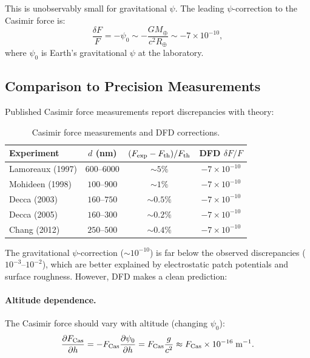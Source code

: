 \documentclass[aps,prb,twocolumn,superscriptaddress,floatfix,nofootinbib,longbibliography]{revtex4-2}
\begin{document}
This is unobservably small for gravitational $\psi$.  The leading
$\psi$-correction to the Casimir force is:
\begin{equation}
\frac{\delta F}{F} = -\psi_0 \sim -\frac{GM_\oplus}{c^2 R_\oplus}
\sim -7 \times 10^{-10},
\label{eq:casimir-earth}
\end{equation}
where $\psi_0$ is Earth's gravitational $\psi$ at the laboratory.

\subsection{Comparison to Precision Measurements}

Published Casimir force measurements report discrepancies with theory:

\begin{table}[h]
\caption{Casimir force measurements and DFD corrections.}
\label{tab:casimir}
\begin{ruledtabular}
\begin{tabular}{lccc}
Experiment & $d$ (nm) & $(F_{\rm exp} - F_{\rm th})/F_{\rm th}$ & DFD $\delta F/F$ \\
\hline
Lamoreaux (1997) & $600$--$6000$ & $\sim 5\%$ & $-7\times 10^{-10}$ \\
Mohideen (1998) & $100$--$900$ & $\sim 1\%$ & $-7\times 10^{-10}$ \\
Decca (2003) & $160$--$750$ & $\sim 0.5\%$ & $-7\times 10^{-10}$ \\
Decca (2005) & $160$--$300$ & $\sim 0.2\%$ & $-7\times 10^{-10}$ \\
Chang (2012) & $250$--$500$ & $\sim 0.4\%$ & $-7\times 10^{-10}$ \\
\end{tabular}
\end{ruledtabular}
\end{table}

The gravitational $\psi$-correction ($\sim 10^{-10}$) is far below the
observed discrepancies ($10^{-3}$--$10^{-2}$), which are better explained
by electrostatic patch potentials and surface roughness.  However, DFD
makes a clean prediction:

\paragraph{Altitude dependence.}  The Casimir force should vary with
altitude (changing $\psi_0$):
\begin{equation}
\frac{\partial F_{\rm Cas}}{\partial h} = -F_{\rm Cas}\frac{\partial\psi_0}
{\partial h} = F_{\rm Cas}\frac{g}{c^2}
\approx F_{\rm Cas} \times 10^{-16}\;\text{m}^{-1}.
\label{eq:casimir-altitude}
\end{equation}
\end{document}
